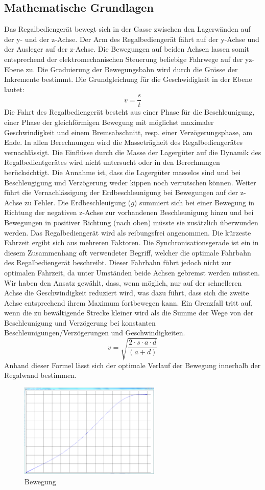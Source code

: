 \subsection{Mathematische Grundlagen}
Das Regalbediengerät bewegt sich in der Gasse zwischen den Lagerwänden auf der y- und der z-Achse. Der Arm des Regalbediengerät fährt auf der y-Achse und der Ausleger auf der z-Achse. Die Bewegungen auf beiden Achsen lassen somit entsprechend der elektromechanischen Steuerung beliebige Fahrwege auf der yz-Ebene zu. Die Graduierung der Bewegungsbahn wird durch die Grösse der Inkremente bestimmt.
%
Die Grundgleichung für die Geschwidigkeit in der Ebene lautet:
%
\begin{equation}
v = \frac{s}{t}
\end{equation}
%
Die Fahrt des Regalbediengerät besteht aus einer Phase für die Beschleunigung, einer Phase der gleichförmigen Bewegung mit möglichst maximaler Geschwindigkeit und einem Bremsabschnitt, resp. einer Verzögerungsphase, am Ende. In allen Berechnungen wird die Masseträgheit des Regalbediengerätes vernachlässigt. Die Einflüsse durch die Masse der Lagergüter auf die Dynamik des Regalbedientgerätes wird nicht untersucht oder in den Berechnungen berücksichtigt. Die Annahme ist, dass die Lagergüter masselos sind und bei Beschleugigung und Verzögerung weder kippen noch verrutschen können. Weiter führt die Vernachlässigung der Erdbeschleunigung bei Bewegungen auf der z-Achse zu Fehler. Die Erdbeschleuigung ($ g $) summiert sich bei einer Bewegung in Richtung der negativen z-Achse zur vorhandenen Beschleunigung hinzu und bei Bewegungen in positiver Richtung (nach oben) müsste sie zusätzlich überwunden werden. Das Regalbediengerät wird als reibungsfrei angenommen.
%
Die kürzeste Fahrzeit ergibt sich aus mehreren Faktoren. Die Synchronisationsgerade ist ein in diesem Zusammenhang oft verwendeter Begriff, welcher die optimale Fahrbahn des Regalbediengerät beschreibt. Dieser Fahrbahn führt jedoch nicht zur optimalen Fahrzeit, da unter Umständen beide Achsen gebremst werden müssten. Wir haben den Ansatz gewählt, dass, wenn möglich, nur auf der schnelleren Achse die Geschwindigkeit reduziert wird, was dazu führt, dass sich die zweite Achse entsprechend ihrem Maximum fortbewegen kann.
%
Ein Grenzfall tritt auf, wenn die zu bewältigende Strecke kleiner wird als die Summe der Wege von der Beschleunigung und Verzögerung bei konstanten Beschleunigungen/Verzögerungen und Geschwindigkeiten. 
%
\begin{equation}
v = \sqrt{\frac{2 \cdot s \cdot a \cdot d}{(a+d)}}
\end{equation}
%
Anhand dieser Formel lässt sich der optimale Verlauf der Bewegung innerhalb der Regalwand bestimmen.
%
\begin{figure}[H]
  \begin{center}
    \includegraphics[width=0.6\textwidth]{images/motion.png}
    \caption{Bewegung}
    \label{fig:beweg}
  \end{center}
\end{figure}
%
